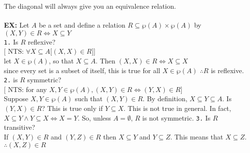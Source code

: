 \documentclass{article}
\begin{document}
		The diagonal will always give you an equivalence relation.\\
		\\
		\textbf{EX:} Let $A$ be a set and define a relation $R\subseteq \wp(A)\times\wp(A)$ by\\
		$(X,Y)\in R\iff X\subseteq Y$\\
		\texttt{1.} Is $R$ reflexive?\\
		$\lbrack$ NTS: $\forall X\subseteq A\lbrack (X,X)\in R\rbrack\rbrack$\\
		let $X\in\wp(A)$, so that $X\subseteq A$. Then $(X,X)\in R\iff X\subseteq X$\\
		since every set is a subset of itself, this is true for all $X\in\wp(A)$ $\therefore R$ is reflexive.\\
		\texttt{2.} is $R$ symmetric?\\
		$\lbrack$ NTS: for any $X,Y\in\wp(A), (X,Y)\in R\iff (Y,X)\in R\rbrack$\\
		Suppose $X,Y\in\wp(A)$ such that $(X,Y)\in R$. By definition, $X\subseteq Y\subseteq A$. Is $(Y,X)\in R$? This is true only if $Y\subseteq X$. This is not true in general. In fact, $X\subseteq Y\land Y\subseteq X \iff X = Y$. So, unless $A=\emptyset$, $R$ is not symmetric.
		\texttt{3.} Is $R$ transitive?\\
		If $(X,Y)\in R$ and $(Y,Z)\in R$ then $X\subseteq Y$ and $Y\subseteq Z$. This means that $X\subseteq Z$. $\therefore (X,Z)\in R$
		\section[04/26/18]{}
\end{document}
